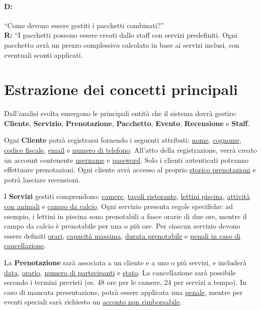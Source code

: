 \documentclass[a4paper,12pt]{report}
\begin{document}
\paragraph{D:}
“Come devono essere gestiti i pacchetti combinati?”
\\ {\bf R:} “I pacchetti possono essere creati dallo staff con servizi predefiniti. Ogni pacchetto avrà un prezzo complessivo calcolato in base ai
servizi inclusi, con eventuali sconti applicati.

\newpage
\section{Estrazione dei concetti principali}
Dall'analisi svolta emergono le principali entità che il sistema dovrà gestire: \textbf{Cliente}, \textbf{Servizio}, \textbf{Prenotazione},
\textbf{Pacchetto}, \textbf{Evento}, \textbf{Recensione} e \textbf{Staff}.

Ogni \textbf{Cliente} potrà registrarsi fornendo i seguenti attributi: \newline \underline{nome}, \underline{cognome}, \underline{codice fiscale},
\underline{email} e \underline{numero di telefono}. All'atto della registrazione, verrà creato un account contenente \underline{username} e \underline{password}. Solo i clienti
autenticati potranno effettuare prenotazioni. Ogni cliente avrà accesso al proprio \underline{storico prenotazioni} e potrà lasciare recensioni.

I \textbf{Servizi} gestiti comprendono: \underline{camere}, \underline{tavoli ristorante}, \newline \underline{lettini piscina}, \underline{attività con
	animali} e \underline{campo da calcio}. Ogni servizio presenta regole specifiche: ad esempio, i lettini in piscina sono prenotabili a fasce orarie di
due ore, mentre il campo da calcio è prenotabile per una o più ore. Per ciascun servizio devono essere definiti \underline{orari}, \underline{capacità massima},
\underline{durata prenotabile} e \underline{penali in caso di cancellazione}.

La \textbf{Prenotazione} sarà associata a un cliente e a uno o più servizi, e includerà \underline{data}, \underline{orario}, \underline{numero di
	partecipanti} e \underline{stato}. La cancellazione sarà possibile secondo i termini previsti (es. 48 ore per le camere, 24 per servizi a tempo). In caso di
mancata presentazione, potrà essere applicata una \underline{penale}, mentre per eventi speciali sarà richiesto un \underline{acconto non rimborsabile}.
\end{document}
